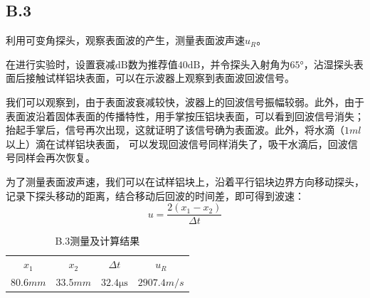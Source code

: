 \documentclass[UTF8,a4paper]{article}%
\begin{document}
\subsection*{B.3}
利用可变角探头，观察表面波的产生，测量表面波声速$u_R$。

在进行实验时，设置衰减$\unit{\dB}$数为推荐值$40\unit{\dB}$，并令探头入射角为$\ang{65}$，沾湿探头表面后接触试样铝块表面，可以在示波器上观察到表面波回波信号。

我们可以观察到，由于表面波衰减较快，波器上的回波信号振幅较弱。此外，由于表面波沿着固体表面的传播特性，用手掌按压铝块表面，可以看到回波信号消失；抬起手掌后，信号再次出现，这就证明了该信号确为表面波。此外，将水滴（$1\unit{ml}$以上）滴在试样铝块表面，
可以发现回波信号同样消失了，吸干水滴后，回波信号同样会再次恢复。

为了测量表面波声速，我们可以在试样铝块上，沿着平行铝块边界方向移动探头，记录下探头移动的距离，结合移动后回波的时间差，即可得到波速：
$$u=\frac{2(x_1-x_2)}{\Delta t}$$
\begin{table}[H]
    \centering
    \caption{B.3测量及计算结果}
    \label{tab:b3}
    \begin{tabular}{cccc}
        \hline
        $x_1$           & $x_2$           & $\Delta t$                 & $u_R$              \\
        $80.6\unit{mm}$ & $33.5\unit{mm}$ & $32.4\unit{\micro\second}$ & $2907.4\unit{m/s}$ \\ \hline
    \end{tabular}
\end{table}
\end{document}

